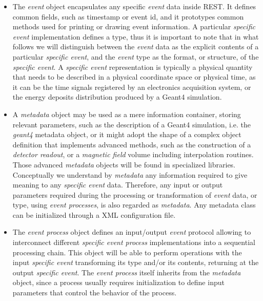 \begin{itemize}
    \item The \emph{event} object encapsulates any specific \emph{event} data inside REST. It defines common fields, such as timestamp or event id, and it prototypes common methods used for printing or drawing event information. A particular \emph{specific event} implementation defines a type, thus it is important to note that in what follows we will distinguish between the \emph{event} data as the explicit contents of a particular \emph{specific event}, and the \emph{event} type as the format, or structure, of the \emph{specific event}. A \emph{specific event} representation is typically a physical quantity that needs to be described in a physical coordinate space or physical time, as it can be the time signals registered by an electronics acquisition system, or the energy deposits distribution produced by a Geant4 simulation.
    
    \item A \emph{metadata} object may be used as a mere information container, storing relevant parameters, such as the description of a Geant4 simulation, i.e. the \emph{geant4} metadata object, or it might adopt the shape of a complex object definition that implements advanced methods, such as the construction of a \emph{detector readout}, or a \emph{magnetic field} volume including interpolation routines. Those advanced \emph{metadata} objects will be found in specialized libraries. Conceptually we understand by \emph{metadata} any information required to give meaning to any \emph{specific event} data. Therefore, any input or output parameters required during the processing or transformation of \emph{event} data, or type, using \emph{event processes}, is also regarded as \emph{metadata}. Any metadata class can be initialized through a XML configuration file.
    
    \item The \emph{event process} object defines an input/output \emph{event} protocol allowing to interconnect different \emph{specific event process} implementations into a sequential processing chain. This object will be able to perform operations with the input \emph{specific event} transforming its type and/or its contents, returning at the output \emph{specific event}. The \emph{event process} itself inherits from the \emph{metadata} object, since a process usually requires initialization to define input parameters that control the behavior of the process.
\end{itemize}

